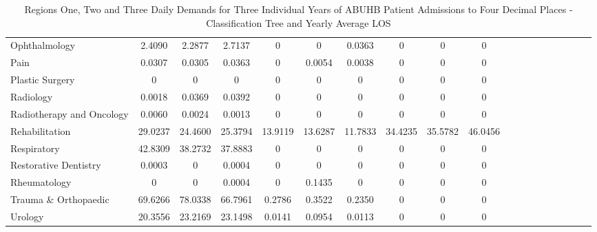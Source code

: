 \documentclass[thesis.tex]{subfiles}
\begin{document}
\begin{landscape}
\begin{table}[h!]
{\begin{tabular}{lcccccccccccccccccc}
Ophthalmology	&2.4090	&2.2877&	2.7137	&0	&0&0.0363&	0	&0&	0\\
Pain	&0.0307&	0.0305&	0.0363&	0	&0.0054	&0.0038&	0&	0	&0\\
Plastic Surgery&	0	&0&	0&	0	&0&	0&	0&	0	&0\\
Radiology&	0.0018&	0.0369	&0.0392&	0&	0	&0&	0&	0&	0\\
Radiotherapy and Oncology&	0.0060	&0.0024	&0.0013&	0&	0&	0	&0&	0	&0\\
Rehabilitation	&29.0237	&24.4600&	25.3794	&13.9119	&13.6287&	11.7833	&34.4235&	35.5782&	46.0456\\
Respiratory	&42.8309&	38.2732&	37.8883&	0	&0	&0	&0&	0&	0\\
Restorative Dentistry	&0.0003	&0&	0.0004	&0	&0&	0&	0&	0&	0\\
Rheumatology	&0	&0&	0.0004&	0	&0.1435&	0	&0	&0&	0\\
Trauma \& Orthopaedic	&69.6266	&78.0338&	66.7961&	0.2786&	0.3522&	0.2350	&0	&0	&0\\
Urology&	20.3556	&23.2169&	23.1498	&0.0141	&0.0954&	0.0113&	0	&0	&0\\
\bottomrule
\end{tabular}  } 
\caption{Regions One, Two and Three Daily Demands for Three Individual Years of ABUHB Patient Admissions to Four Decimal Places - Classification Tree and Yearly Average LOS}
    \label{apptab:LinkedDemands7a}
\end{table}  



\begin{table}[h!]
    \centering{}
\end{table}
\end{landscape}
\end{document}
